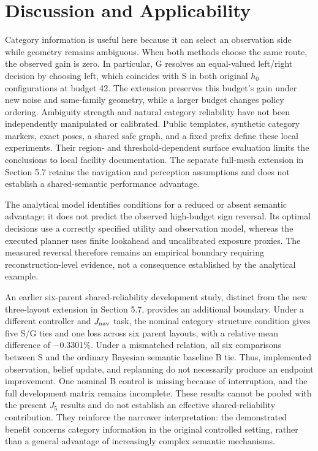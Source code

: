 \documentclass[11pt,a4paper]{article}
\begin{document}
\hypertarget{discussion-and-applicability}{%
\section{Discussion and Applicability}\label{discussion-and-applicability}}

Category information is useful here because it can select an observation side while geometry remains ambiguous. When both methods choose the same route, the observed gain is zero. In particular, G resolves an equal-valued left/right decision by choosing left, which coincides with S in both original \(h_0\) configurations at budget 42. The extension preserves this budget's gain under new noise and same-family geometry, while a larger budget changes policy ordering. Ambiguity strength and natural category reliability have not been independently manipulated or calibrated. Public templates, synthetic category markers, exact poses, a shared safe graph, and a fixed prefix define these local experiments. Their region- and threshold-dependent surface evaluation limits the conclusions to local facility documentation. The separate full-mesh extension in Section 5.7 retains the navigation and perception assumptions and does not establish a shared-semantic performance advantage.

The analytical model identifies conditions for a reduced or absent semantic advantage; it does not predict the observed high-budget sign reversal. Its optimal decisions use a correctly specified utility and observation model, whereas the executed planner uses finite lookahead and uncalibrated exposure proxies. The measured reversal therefore remains an empirical boundary requiring reconstruction-level evidence, not a consequence established by the analytical example.

An earlier six-parent shared-reliability development study, distinct from the new three-layout extension in Section 5.7, provides an additional boundary. Under a different controller and \(J_{\rm nav}\) task, the nominal category--structure condition gives five S/G ties and one loss across six parent layouts, with a relative mean difference of −0.3301\%. Under a mismatched relation, all six comparisons between S and the ordinary Bayesian semantic baseline B tie. Thus, implemented observation, belief update, and replanning do not necessarily produce an endpoint improvement. One nominal B control is missing because of interruption, and the full development matrix remains incomplete. These results cannot be pooled with the present \(J_5\) results and do not establish an effective shared-reliability contribution. They reinforce the narrower interpretation: the demonstrated benefit concerns category information in the original controlled setting, rather than a general advantage of increasingly complex semantic mechanisms.
\end{document}
